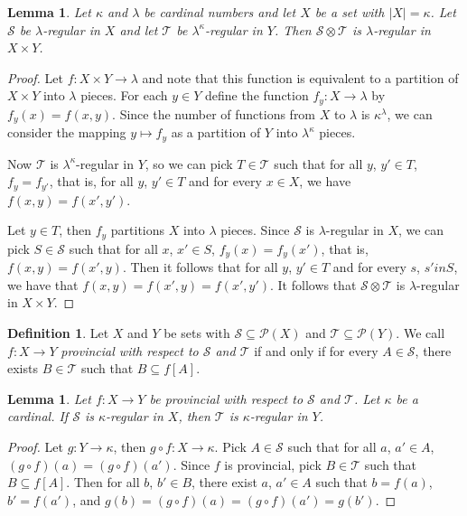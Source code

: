 \documentclass[12pt]{article}
\theoremstyle{plain}
\newtheorem{lem}[thm]{Lemma}
\theoremstyle{definition}
\newtheorem{defn}[thm]{Definition}
\newcommand{\calP}{\mathcal{P}}
\newcommand{\calS}{\mathcal{S}}
\newcommand{\calT}{\mathcal{T}}
\begin{document}
\begin{lem}
  \label{lem:TensorReg}
  Let $\kappa$ and $\lambda$ be cardinal numbers and let $X$ be a set
  with $|X| = \kappa$. 
  Let $\calS$ be \mbox{$\lambda$-regular} in $X$ and let $\calT$ be
  \mbox{$\lambda^\kappa$-regular} in $Y$.
  Then $\calS \otimes \calT$ is \mbox{$\lambda$-regular} in $X \times
  Y$.
\end{lem}
\begin{proof}
  Let $f \colon X \times Y \to \lambda$ and note that this function is
  equivalent to a partition of $X \times Y$ into $\lambda$ pieces.
  For each $y \in Y$ define the function $f_y \colon X \to \lambda$ by
  $f_y(x) = f(x,y)$. 
  Since the number of functions from $X$ to $\lambda$ is
  $\kappa^\lambda$, we can consider the mapping $y \mapsto f_y$ as a
  partition of $Y$ into $\lambda^\kappa$ pieces.
  
  Now $\calT$ is \mbox{$\lambda^\kappa$-regular} in $Y$, so we can
  pick $T \in \calT$ such that for all $y$, $y' \in T$, $f_y =
  f_{y'}$, that is, for all $y$, $y' \in T$ and for every $x \in
  X$, we have $f(x,y) = f(x',y')$.

  Let $y \in T$, then $f_y$ partitions $X$ into $\lambda$ pieces.
  Since $\calS$ is \mbox{$\lambda$-regular} in $X$, we can pick $S \in
  \calS$ such that for all $x$, $x' \in S$, $f_y(x) = f_y(x')$, that
  is, $f(x, y) = f(x', y)$.
  Then it follows that for all $y$, $y' \in T$ and for every $s$, $s'
  in S$, we have that $f(x,y) = f(x', y) = f(x',y')$.
  It follows that $\calS \otimes \calT$ is \mbox{$\lambda$-regular} in
  $X \times Y$.
\end{proof}

\begin{defn}
  Let $X$ and $Y$ be sets with $\calS \subseteq \calP(X)$ and $\calT
  \subseteq \calP(Y)$.
  We call $f \colon X \to Y$ \textsl{provincial with respect to
    $\calS$ and $\calT$} if and only if for every $A \in \calS$, there
  exists $B \in \calT$ such that $B \subseteq f[A]$.
\end{defn}

\begin{lem}
  \label{lem:provin}
  Let $f \colon X \to Y$ be provincial with respect to $\calS$ and
  $\calT$.
  Let $\kappa$ be a cardinal.
  If $\calS$ is \mbox{$\kappa$-regular} in $X$, then $\calT$ is
  \mbox{$\kappa$-regular} in $Y$.
\end{lem}
\begin{proof}
  Let $g \colon Y \to \kappa$, then $g \circ f \colon X \to \kappa$.
  Pick $A \in \calS$ such that for all $a$, $a' \in A$, $(g \circ
  f)(a) = (g \circ f)(a')$.
  Since $f$ is provincial, pick $B \in \calT$ such that $B \subseteq
  f[A]$.
  Then for all $b$, $b' \in B$, there exist $a$, $a' \in A$ such that
  $b = f(a)$, $b' = f(a')$, and $g(b) = (g \circ f)(a) = (g \circ
  f)(a') = g(b')$.
\end{proof}
\end{document}
